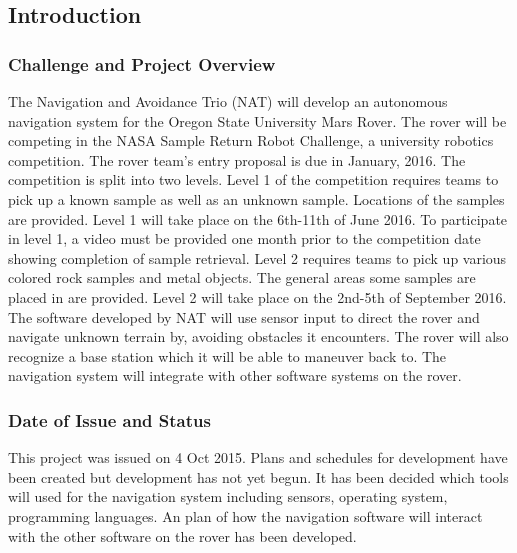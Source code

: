 \documentclass[10pt, oneside,onecolumn]{IEEEtran}
\begin{document}
\subsection{Introduction}

\subsubsection{Challenge and Project Overview}

The Navigation and Avoidance Trio (NAT) will develop an autonomous navigation system for the Oregon State University Mars Rover. The rover will be competing in the NASA Sample Return Robot Challenge, a university robotics competition. The rover team's entry proposal is due in January, 2016. The competition is split into two levels. Level 1 of the competition requires teams to pick up a known sample as well as an unknown sample. Locations of the samples are provided. Level 1 will take place on the 6th-11th of June 2016. To participate in level 1, a video must be provided one month prior to the competition date showing completion of sample retrieval. Level 2 requires teams to pick up various colored rock samples and metal objects. The general areas some samples are placed in are provided. Level 2 will take place on the 2nd-5th of September 2016. The software developed by NAT will use sensor input to direct the rover and navigate unknown terrain by, avoiding obstacles it encounters. The rover will also recognize a base station which it will be able to maneuver back to. The navigation system will integrate with other software systems on the rover.

\subsubsection{Date of Issue and Status}

This project was issued on 4 Oct 2015. Plans and schedules for development have been created but development has not yet begun. It has been decided which tools will used for the navigation system including sensors, operating system, programming languages. An plan of how the navigation software will interact with the other software on the rover has been developed. 

\end{document}
